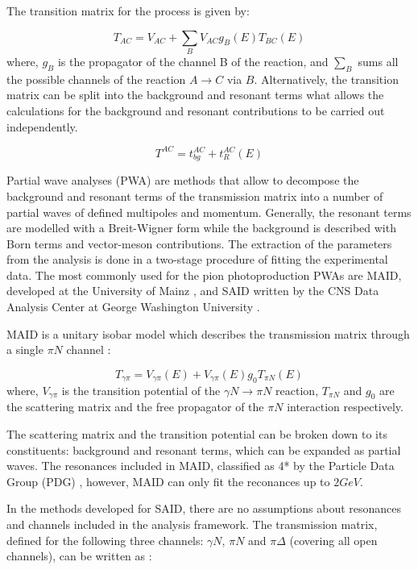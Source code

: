 \indent The transition matrix for the process is given by:

\begin{equation}
T_{AC}=V_{AC}+\sum\limits_{B}V_{AC}g_{B}(E)T_{BC}(E)
\end{equation}
where, $g_{B}$ is the propagator of the channel B of the reaction, and $\sum\limits_{B}$ sums all the possible channels of the reaction $A\rightarrow C$ via $B$. Alternatively, the transition matrix can be split into the background and resonant terms what allows the calculations for the background and resonant contributions to be carried out independently.

\begin{equation}
T^{AC}=t_{bg}^{AC}+t_{R}^{AC}(E)
\end{equation}

\indent Partial wave analyses (PWA) are methods that allow to decompose the background and resonant terms of the transmission matrix into a number of partial waves of defined multipoles and momentum. Generally, the resonant terms are modelled with a Breit-Wigner form while the background is described with Born terms and vector-meson contributions. The extraction of the parameters from the analysis is done in a two-stage procedure of fitting the experimental data. 
\indent The most commonly used for the pion photoproduction PWAs are MAID, developed at the University of Mainz \cite{maid}, and SAID written by the CNS Data Analysis Center at George Washington University \cite{said}.

\indent MAID is a unitary isobar model which describes the transmission matrix through a single $\pi N$ channel \cite {drechsel}:

\begin{equation}
T_{\gamma\pi}=V_{\gamma\pi}(E)+V_{\gamma\pi}(E)g_{0}T_{\pi N}(E)
\end{equation}
where, $V_{\gamma\pi}$ is the transition potential of the $\gamma N\rightarrow \pi N$ reaction, $T_{\pi N}$ and $g_{0}$ are the scattering matrix and the free propagator of the $\pi N$ interaction respectively.

\indent The scattering matrix and the transition potential can be broken down to its constituents: background and resonant terms, which can be expanded as partial waves. The resonances included in MAID, classified as 4* by the Particle Data Group (PDG) \cite{pda}, however, MAID can only fit the reconances up to $2GeV$.

\indent In the methods developed for SAID, there are no assumptions about resonances and channels included in the analysis framework. The transmission matrix, defined for the following three channels: $\gamma N$, $\pi N$ and $\pi \Delta$ (covering all open channels), can be written as \cite{arndt}:

